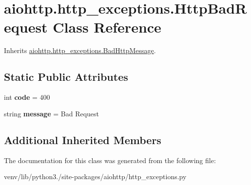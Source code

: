 \hypertarget{classaiohttp_1_1http__exceptions_1_1_http_bad_request}{}\section{aiohttp.\+http\+\_\+exceptions.\+Http\+Bad\+Request Class Reference}
\label{classaiohttp_1_1http__exceptions_1_1_http_bad_request}


Inherits \hyperlink{classaiohttp_1_1http__exceptions_1_1_bad_http_message}{aiohttp.\+http\+\_\+exceptions.\+Bad\+Http\+Message}.

\subsection*{Static Public Attributes}
\begin{DoxyCompactItemize}
\item 
\mbox{\label{classaiohttp_1_1http__exceptions_1_1_http_bad_request_ab1d488265bbb1bc532095e60a86caeda}} 
int {\bfseries code} = 400
\item 
\mbox{\label{classaiohttp_1_1http__exceptions_1_1_http_bad_request_a3e6cd6f899d360bf081b4e2c8d8b3176}} 
string {\bfseries message} = \textquotesingle{}Bad Request\textquotesingle{}
\end{DoxyCompactItemize}
\subsection*{Additional Inherited Members}


The documentation for this class was generated from the following file\+:\begin{DoxyCompactItemize}
\item 
venv/lib/python3./site-\/packages/aiohttp/http\+\_\+exceptions.\+py\end{DoxyCompactItemize}
